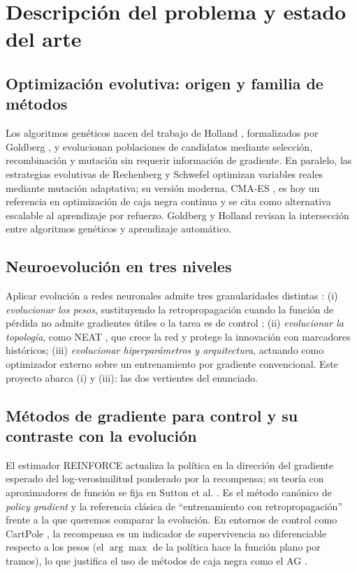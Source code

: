\section{Descripción del problema y estado del arte}
\label{sec:estado}

\subsection{Optimización evolutiva: origen y familia de métodos}

Los algoritmos genéticos nacen del trabajo de Holland \cite{holland1975}, formalizados por Goldberg \cite{goldberg1989}, y evolucionan poblaciones de candidatos mediante selección, recombinación y mutación sin requerir información de gradiente. En paralelo, las estrategias evolutivas de Rechenberg \cite{rechenberg1973} y Schwefel \cite{schwefel1995} optimizan variables reales mediante mutación adaptativa; su versión moderna, CMA-ES \citep{hansen2001}, es hoy un referencia en optimización de caja negra continua y se cita como alternativa escalable al aprendizaje por refuerzo. Goldberg y Holland \cite{goldberg89schema} revisan la intersección entre algoritmos genéticos y aprendizaje automático.

\subsection{Neuroevolución en tres niveles}

Aplicar evolución a redes neuronales admite tres granularidades distintas \citep{yao1997}:
(i) \emph{evolucionar los pesos}, sustituyendo la retropropagación cuando la función de pérdida no admite gradientes útiles o la tarea es de control \citep{stanley2002};
(ii) \emph{evolucionar la topología}, como NEAT \citep{stanley2002}, que crece la red y protege la innovación con marcadores históricos;
(iii) \emph{evolucionar hiperparámetros y arquitectura}, actuando como optimizador externo sobre un entrenamiento por gradiente convencional. Este proyecto abarca (i) y (iii): las dos vertientes del enunciado.

\subsection{Métodos de gradiente para control y su contraste con la evolución}

El estimador REINFORCE \citep{williams1992} actualiza la política en la dirección del gradiente esperado del log-verosimilitud ponderado por la recompensa; su teoría con aproximadores de función se fija en Sutton et al. \cite{sutton1999}. Es el método canónico de \emph{policy gradient} y la referencia clásica de ``entrenamiento con retropropagación'' frente a la que queremos comparar la evolución. En entornos de control como CartPole \citep{brockman2016}, la recompensa es un indicador de supervivencia no diferenciable respecto a los pesos (el $\arg\max$ de la política hace la función plano por tramos), lo que justifica el uso de métodos de caja negra como el AG \citep{goldberg1989}.

